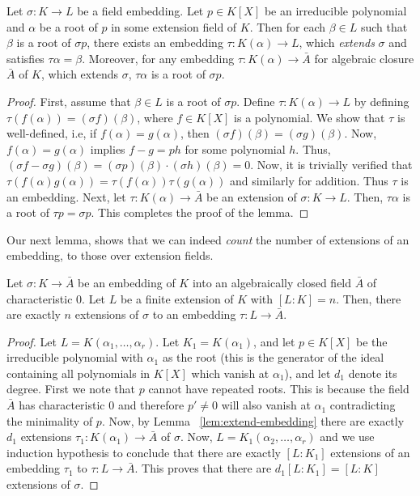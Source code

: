 \documentclass[11pt]{article}
\begin{document}
\begin{lemma}\label{lem:extend-embedding}
Let $\sigma:K\rightarrow L$ be a field embedding. Let $p\in K[X]$ be an irreducible polynomial and $\alpha$ be a root of $p$ in some
extension field of $K$. Then for each $\beta\in L$ such that $\beta$ is a root of $\sigma p$, there exists an embedding $\tau:K(\alpha)\rightarrow L$,
which {\em extends} $\sigma$ and satisfies $\tau \alpha = \beta$. Moreover, for any embedding $\tau:K(\alpha)\rightarrow \bar{A}$ for
algebraic closure $\bar{A}$ of $K$, which extends $\sigma$, $\tau \alpha$ is a root of $\sigma p$.
\end{lemma}
\begin{proof}
First, assume that $\beta\in L$ is a root of $\sigma p$. Define $\tau: K(\alpha)\rightarrow L$ by defining $\tau(f(\alpha))=(\sigma f)(\beta)$,
where $f\in K[X]$ is a polynomial. We show that $\tau$ is well-defined, i.e, if $f(\alpha)=g(\alpha)$, then $(\sigma f)(\beta)=(\sigma g)(\beta)$.
Now, $f(\alpha)=g(\alpha)$ implies $f-g=ph$ for some polynomial $h$. Thus, $(\sigma f - \sigma g)(\beta)=(\sigma p)(\beta)\cdot (\sigma h)(\beta)=0$.
Now, it is trivially verified that $\tau(f(\alpha) g(\alpha))=\tau(f(\alpha))\tau(g(\alpha))$ and similarly for addition. Thus $\tau$ is an embedding.
Next, let $\tau: K(\alpha)\rightarrow \bar{A}$ be an extension of $\sigma: K\rightarrow L$. Then, $\tau \alpha$ is a root of $\tau p=\sigma p$. This
completes the proof of the lemma.
\end{proof}

Our next lemma, shows that we can indeed {\em count} the number of extensions of an embedding, to those over extension fields.
\begin{lemma}\label{lem:extend-embedding-extension}
Let $\sigma:K\rightarrow \bar{A}$ be an embedding of $K$ into an algebraically closed field $\bar{A}$ of characteristic $0$. Let $L$ be a finite extension of $K$ with
$[L:K]=n$. Then, there are exactly $n$ extensions of $\sigma$ to an embedding $\tau:L\rightarrow \bar{A}$.
\end{lemma}
\begin{proof}
Let $L=K(\alpha_1,\ldots,\alpha_r)$. Let $K_1=K(\alpha_1)$, and let $p\in K[X]$ be the irreducible polynomial with $\alpha_1$ as the root (this is
the generator of the ideal containing all polynomials in $K[X]$ which vanish at $\alpha_1$), and let $d_1$ denote its degree. First we note that
$p$ cannot have repeated roots. This is because the field $\bar{A}$ has characteristic $0$ and therefore $p'\neq 0$ will also vanish at $\alpha_1$
contradicting the minimality of $p$. Now, by Lemma ~\ref{lem:extend-embedding} there are exactly $d_1$ extensions $\tau_1:K(\alpha_1)\rightarrow \bar{A}$
of $\sigma$. Now, $L=K_1(\alpha_2,\ldots,\alpha_r)$ and we use induction hypothesis to conclude that there are exactly $[L:K_1]$ extensions of an embedding
$\tau_1$ to $\tau:L\rightarrow \bar{A}$. This proves that there are $d_1[L:K_1]=[L:K]$ extensions of $\sigma$.
\end{proof}
\end{document}
